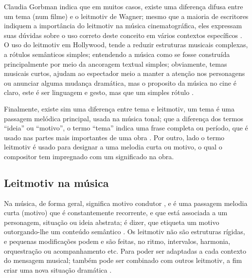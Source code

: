 Claudia Gorbman indica que em muitos casos, 
existe uma diferença difusa entre um tema (num filme) e o leitmotiv de Wagner;
mesmo que a maioria de escritores indiquem a importância do leitmotiv na música cinematográfica,
eles   expressam suas dúvidas sobre o uso correto deste conceito em vários contextos específicos \cite[pp. 190]{nasta2004perspective}.
O uso do leitmotiv em Hollywood, tende a reduzir estruturas musicais complexas, 
a rótulos semânticos simples; entendendo a música como se fosse construída principalmente por meio da ancoragem textual simples;
obviamente, temas musicais curtos, ajudam ao espectador meio a manter a atenção nos personagens ou  anunciar alguma mudança dramática,
mas o proposito da música no cine é claro, este é ser linguagem e  gesto, mas que um simples rótulo  \cite[pp. 195]{nasta2004perspective}.


Finalmente, existe sim uma diferença entre tema e leitmotiv, 
um tema é uma passagem melódica principal, usada na música tonal; 
que a diferença dos termos ``ideia'' ou ``motivo'', 
o termo ``tema'' indica uma frase completa ou período, 
que é usado nas partes mais importantes de uma obra \cite[pp. 1496]{latham2008diccionario}. 
Por outro, lado o termo leitmotiv é usado para designar a uma melodia curta ou motivo, 
o qual o compositor tem impregnado com um significado na obra. 

\subsection{Leitmotiv na música}

Na música, de forma geral,
significa motivo condutor \cite[pp. 230]{holst1998abc} \cite[pp. 465]{apel1969harvard}, 
e é uma passagem melodia curta (motivo) que é constantemente recorrente, e
que está associada a um personagem, situação ou ideia abstrata;
é dizer, que etiqueta um motivo outorgando-lhe  um conteúdo semântico \cite[pp. 230]{holst1998abc} \cite[pp. 7-8]{bribitzer2015understanding}.
Os leitmotiv não são estruturas rígidas, e pequenas modificações podem e são feitas,
no ritmo, intervalos, harmonia, orquestração ou acompanhamento  \cite[pp. 466]{apel1969harvard}
\cite[pp. 465]{apel1969harvard} \cite[pp. 188]{nasta2004perspective} etc. 
Para poder ser adaptadas a cada contexto do mensagem musical;
também pode ser combinado com outros leitmotiv, a fim criar uma nova situação dramática \cite[pp. 188]{nasta2004perspective}.







